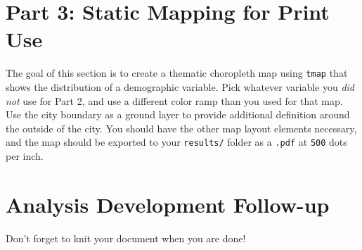 \documentclass{tufte-handout}
\begin{document}
\vspace{5mm}
\section{Part 3: Static Mapping for Print Use}
The goal of this section is to create a thematic choropleth map using \texttt{tmap} that shows the distribution of a demographic variable. Pick whatever variable you \textit{did not} use for Part 2, and use a different color ramp than you used for that map. Use the city boundary as a ground layer to provide additional definition around the outside of the city. You should have the other map layout elements necessary, and the map should be exported to your \texttt{results/} folder as a \texttt{.pdf} at \texttt{500} dots per inch.

\vspace{5mm}
\section{Analysis Development Follow-up}
Don't forget to knit your document when you are done!

\end{document}
